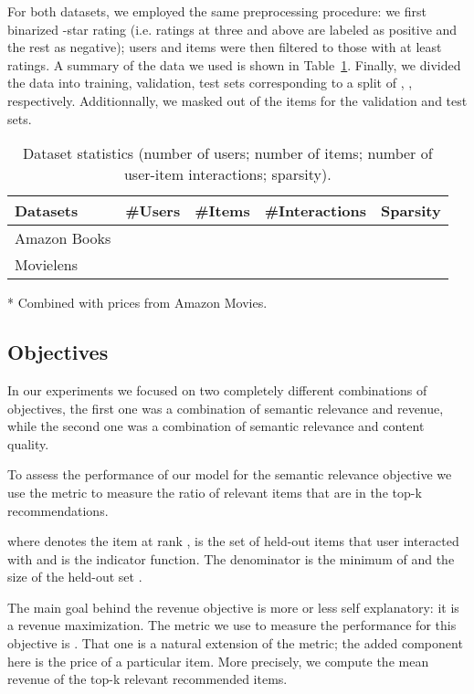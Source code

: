 \documentclass[letterpaper]{article}
\begin{document}
For both datasets, we employed the same preprocessing procedure: we first binarized -star rating (i.e. ratings at three and above are labeled as positive and the rest as negative); users and items were then filtered to those with at least  ratings. A summary of the data we used is shown in Table~\ref{table_data_desc}. Finally, we divided the data into training, validation, test sets corresponding to a split of , ,  respectively. Additionnally, we masked out  of the items for the validation and test sets.

\begin{table}[!h]
\small
\begin{threeparttable}[t]
    \centering
\begin{tabular}{lcccc} 
Datasets & \#Users & \#Items & \#Interactions & Sparsity\\
\hline
Amazon Books &  &  &  & \\
Movielens\tnote{*} &  &  &  & \\
\end{tabular}
\begin{tablenotes}
     \item[*]Combined with prices from Amazon Movies.
   \end{tablenotes}
\end{threeparttable}
\caption{Dataset statistics (number of users; number of items; number of user-item interactions; sparsity).}
\label{table_data_desc}
\end{table} 

\subsection{Objectives}

In our experiments we focused on two completely different combinations of objectives, the first one was a combination of semantic relevance and revenue, while the second one was a combination of semantic relevance and content quality.

To assess the performance of our model for the semantic relevance objective we use the  metric to measure the ratio of relevant items that are in the top-k recommendations.



where  denotes the item at rank ,  is the set of held-out items that user  interacted with and  is the indicator function. The denominator is the minimum of  and the size of the held-out set  \cite{liang2018variational}.

The main goal behind the revenue objective is more or less self explanatory: it is a revenue maximization. The metric we use to measure the performance for this objective is . That one is a natural extension of the  metric; the added component here is the price of a particular item. More precisely, we compute the mean revenue of the top-k relevant recommended items.
\end{document}
